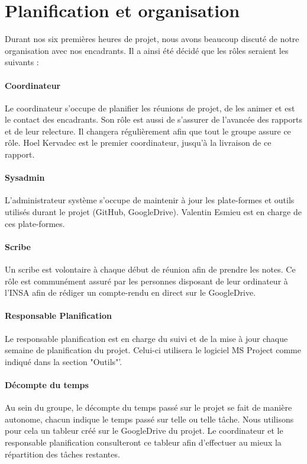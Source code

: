 \section{Planification et organisation}
    Durant nos six premières heures de projet, nous avons beaucoup discuté de notre organisation avec nos encadrants. Il a ainsi été décidé que les rôles seraient les suivants :
    \paragraph{Coordinateur} Le coordinateur s'occupe de planifier les réunions de projet, de les animer et est le contact des encadrants. Son rôle est aussi de s'assurer de l'avancée des rapports et de leur relecture. Il changera régulièrement afin que tout le groupe assure ce rôle. Hoel Kervadec est le premier coordinateur, jusqu'à la livraison de ce rapport.
    \paragraph{Sysadmin} L'administrateur système s'occupe de maintenir à jour les plate-formes et outils utilisés durant le projet (GitHub, GoogleDrive). Valentin Esmieu est en charge de ces plate-formes.
    \paragraph{Scribe} Un scribe est volontaire à chaque début de réunion afin de prendre les notes. Ce rôle est communément assuré par les personnes disposant de leur ordinateur à l'INSA afin de rédiger un compte-rendu en direct sur le GoogleDrive.
    \paragraph{Responsable Planification} Le responsable planification est en charge du suivi et de la mise à jour chaque semaine de planification du projet. Celui-ci utilisera le logiciel MS Project comme indiqué dans la section "Outils"'.
    \paragraph{Décompte du temps} Au sein du groupe, le décompte du temps passé sur le projet se fait de manière autonome, chacun indique le temps passé sur telle ou telle tâche. Nous utilisons pour cela un tableur créé sur le GoogleDrive du projet. Le coordinateur et le responsable planification consulteront ce tableur afin d'effectuer au mieux la répartition des tâches restantes.

